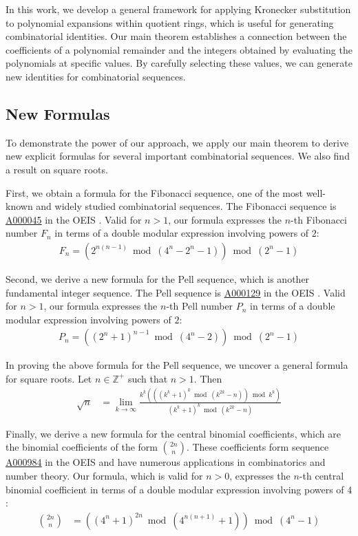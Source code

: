 \documentclass[11pt,reqno]{article}
\theoremstyle{plain}
\theoremstyle{definition}
\newcommand{\seqnum}[1]{\href{https://oeis.org/#1}{\rm \underline{#1}}}
\begin{document}
In this work, we develop a general framework for applying Kronecker substitution to polynomial expansions within quotient rings, which is useful for generating combinatorial identities. Our main theorem establishes a connection between the coefficients of a polynomial remainder and the integers obtained by evaluating the polynomials at specific values. By carefully selecting these values, we can generate new identities for combinatorial sequences.

\subsection{New Formulas}
To demonstrate the power of our approach, we apply our main theorem to derive new explicit formulas for several important combinatorial sequences. We also find a result on square roots.

First, we obtain a formula for the Fibonacci sequence, one of the most well-known and widely studied combinatorial sequences. The Fibonacci sequence is \seqnum{A000045} in the OEIS \cite{A000045}. Valid for $n > 1$, our formula expresses the $n$-th Fibonacci number $F_n$ in terms of a double modular expression involving powers of $2$:
\begin{align*}
    F_n = (2^{n(n-1)} \bmod{(4^n-2^n-1)}) \bmod{(2^n-1)}
\end{align*}

Second, we derive a new formula for the Pell sequence, which is another fundamental integer sequence. The Pell sequence is \seqnum{A000129} in the OEIS \cite{A000129}. Valid for $n > 1$, our formula expresses the $n$-th Pell number $P_n$ in terms of a double modular expression involving powers of $2$:
\begin{align*}
    P_n = ((2^{n}+1)^{n-1} \bmod{(4^n-2)}) \bmod{(2^n-1)}
\end{align*}

In proving the above formula for the Pell sequence, we uncover a general formula for square roots. Let $n \in \mathbb{Z}^+$ such that $n > 1$. Then
\begin{align*}
\sqrt{n} &= \lim_{k\rightarrow\infty}
    \frac{k^k (((k^k + 1)^k \bmod{(k^{2k}-n)}) \bmod{k^k})}
        {(k^k + 1)^k \bmod{(k^{2k}-n)}}
\end{align*}

Finally, we derive a new formula for the central binomial coefficients, which are the binomial coefficients of the form $\binom{2n}{n}$. These coefficients form sequence \seqnum{A000984} in the OEIS \cite{A000984} and have numerous applications in combinatorics and number theory. Our formula, which is valid for $n > 0$, expresses the $n$-th central binomial coefficient in terms of a double modular expression involving powers of $4$:
\begin{align*}
    \binom{2n}{n} &= ((4^n + 1)^{2n} \bmod{(4^{n(n+1)} + 1)}) \bmod{(4^n-1)}
\end{align*}
\end{document}
